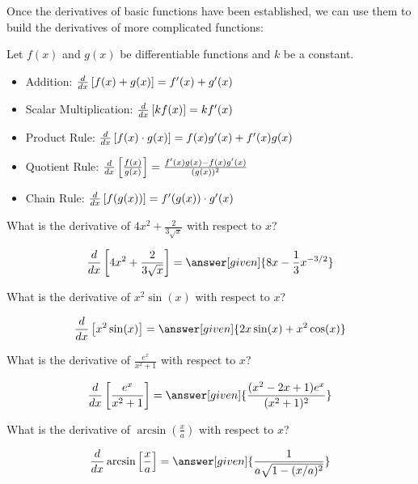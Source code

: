 \documentclass[nooutcomes]{ximera}
\begin{document}
Once the derivatives of basic functions have been established, we can use them to build the derivatives of more complicated functions:


\begin{theorem}
  Let $f(x)$ and $g(x)$ be differentiable functions and $k$ be a constant.
\begin{itemize}
\item Addition: $\frac{d}{\mathop{}\!d x} \left[ f(x) + g(x) \right] = f'(x) + g'(x)$
\item Scalar Multiplication: $\frac{d}{\mathop{}\!d x} \left[ k f(x) \right] = k f'(x)$
\item Product Rule: $\frac{d}{\mathop{}\!d x} \left[f(x) \cdot g(x) \right] = f(x)g'(x) + f'(x)g(x)$
\item Quotient Rule: $\frac{d}{\mathop{}\!d x}  \left[\frac{f(x)}{g(x)}  \right] = \frac{f'(x)g(x) - f(x)g'(x)}{(g(x))^2}$
\item Chain Rule: $\frac{d}{\mathop{}\!d x}  \left[f(g(x)) \right]  = f'(g(x)) \cdot g'(x)$
\end{itemize}
\end{theorem}

\begin{question} 
  What is the derivative of $4x^2 +\frac{2}{3\sqrt{x}} $ with respect to $x$?
  \begin{prompt} 
    \[
    \ddx  \left[4x^2 +\frac{2}{3\sqrt{x}}  \right] = \answer[given]{8x -\frac{1}{3} x^{-3/2}}
    \]
  \end{prompt}
\end{question}

 
\begin{question} 
  What is the derivative of $x^2 \sin(x) $ with respect to $x$?
  \begin{prompt} 
    \[
    \ddx \left[x^2 \sin(x)\right]= \answer[given]{2x \sin(x) +x^2 \cos(x)}
    \]
  \end{prompt}
\end{question}

\begin{question} 
  What is the derivative of $\frac{e^x}{x^2+1}$ with respect to $x$?
  \begin{prompt} 
    \[
    \ddx \left[\frac{e^x}{x^2+1} \right] = \answer[given]{\frac{( x^2 - 2x +1)e^x}{(x^2+1)^2}}
    \]
  \end{prompt}
\end{question}\begin{question} 
  What is the derivative of $\arcsin\left(\frac{x}{a}\right)$ with respect to $x$?
  \begin{prompt} 
    \[
    \ddx \arcsin\left[\frac{x}{a}\right] = \answer[given]{\frac{1}{a \sqrt{1-(x/a)^2}}}
    \]
  \end{prompt}
\end{question}
\end{document}

